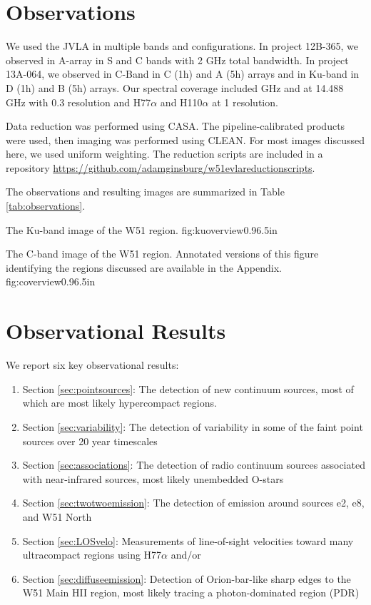 \section{Observations}
We used the JVLA in multiple bands and configurations.  In project 12B-365, we
observed in A-array in S and C bands with 2 GHz total bandwidth.  In project
13A-064, we observed in C-Band in C (1h) and A (5h) arrays and in Ku-band in D
(1h) and B (5h) arrays.  Our spectral coverage included \ortho {} GHz
and \twotwo at 14.488 GHz with 0.3 \kms resolution and H77$\alpha$ and H110$\alpha$
at 1 \kms resolution.

Data reduction was performed using CASA.  The pipeline-calibrated products were
used, then imaging was performed using CLEAN.  For most images discussed here, we
used uniform weighting.  The reduction scripts are included in a repository
\url{https://github.com/adamginsburg/w51evlareductionscripts}.

The observations and resulting images are summarized in Table
\ref{tab:observations}.




{The Ku-band image of the W51 region.}
{fig:kuoverview}{0.9}{6.5in}

{The C-band image of the W51 region.  Annotated versions of this figure
identifying the regions discussed are available in the Appendix.}
{fig:coverview}{0.9}{6.5in}

\section{Observational Results}
We report six key observational results: 
\begin{enumerate}
    \item Section \ref{sec:pointsources}: The detection of new continuum
        sources, most of which are most likely hypercompact \hii regions. 
    \item Section \ref{sec:variability}: The detection of variability in
        some of the faint point sources over 20 year timescales
    \item Section \ref{sec:associations}: The detection of radio continuum
        sources associated with near-infrared sources, most likely unembedded
        O-stars
    \item Section \ref{sec:twotwoemission}: The detection of \formaldehyde
        \twotwo emission around sources e2, e8, and W51 North
    \item Section \ref{sec:LOSvelo}: Measurements of line-of-sight velocities
        toward many ultracompact \hii regions using H77$\alpha$ and/or
        \formaldehyde
    \item Section \ref{sec:diffuseemission}: Detection of Orion-bar-like sharp
        edges to the W51 Main HII region, most likely tracing a
        photon-dominated region (PDR)
\end{enumerate}

